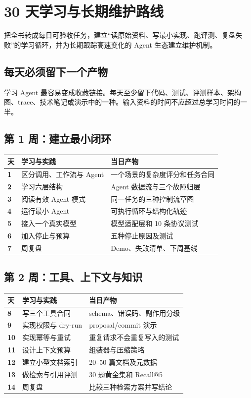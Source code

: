 \chapter{30 天学习与长期维护路线}
\label{chap:roadmap}

\begin{takeaway}[学习目标]
把全书转成每日可验收任务，建立“读原始资料、写最小实现、跑评测、复盘失败”的学习循环，并为长期跟踪高速变化的 Agent 生态建立维护机制。
\end{takeaway}

\section{每天必须留下一个产物}

学习 Agent 最容易变成收藏链接。每天至少留下代码、测试、评测样本、架构图、trace、技术笔记或演示中的一种。输入资料的时间不应超过总学习时间的一半。

\section{第 1 周：建立最小闭环}

\begin{longtable}{>{\bfseries}p{} p{} p{}}
\toprule
天 & 学习与实践 & 当日产物 \\
\midrule
1 & 区分调用、工作流与 Agent & 一个场景的复杂度评分和任务合同 \\
2 & 学习六层结构 & Agent 数据流与三个故障归层 \\
3 & 阅读有效 Agent 模式 & 同一任务的三种控制流草图 \\
4 & 运行最小 Agent & 可执行循环与结构化轨迹 \\
5 & 接入一个真实模型 & 模型适配层和 10 条协议测试 \\
6 & 加入停止与预算 & 五种停止原因及测试 \\
7 & 周复盘 & Demo、失败清单、下周基线 \\
\bottomrule
\end{longtable}

\section{第 2 周：工具、上下文与知识}

\begin{longtable}{>{\bfseries}p{} p{} p{}}
\toprule
天 & 学习与实践 & 当日产物 \\
\midrule
8 & 写三个工具合同 & schema、错误码、副作用分级 \\
9 & 实现权限与 dry-run & proposal/commit 演示 \\
10 & 实现幂等与重试 & 重复请求不会重复写入的测试 \\
11 & 设计上下文预算 & 组装器与压缩策略 \\
12 & 建立小型文档索引 & 20--50 篇文档及元数据 \\
13 & 做检索与引用评测 & 30 题黄金集和 Recall@5 \\
14 & 周复盘 & 比较三种检索方案并写结论 \\
\bottomrule
\end{longtable}

